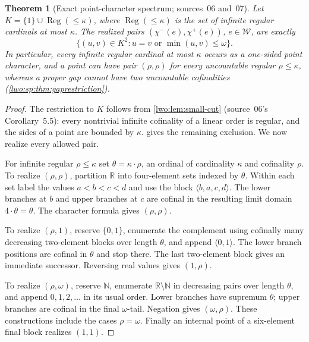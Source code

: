\documentclass[11pt,a4paper]{article}
\newtheorem{theorem}{Theorem}[section]
\theoremstyle{definition}
\theoremstyle{remark}
\newcommand{\R}{\mathbb R}
\newcommand{\N}{\mathbb N}
\newcommand{\W}{\mathcal W}
\newcommand{\Reg}{\operatorname{Reg}}
\newcommand{\chm}{\chi^-}
\newcommand{\chp}{\chi^+}
\begin{document}
\begin{theorem}[Exact point-character spectrum; sources~06 and~07]
\label{lwo:sp:thm:point-spectrum}
Let $K=\{1\}\cup\Reg(\le\kappa)$, where $\Reg(\le\kappa)$ is the set of infinite
regular cardinals at most $\kappa$. The realized pairs $(\chm(e),\chp(e))$,
$e\in\W$, are exactly
\begin{equation}\label{lwo:sp:eq:pointpairs}
 \{(u,v)\in K^2:u=v\text{ or }\min(u,v)\leq\omega\}.
\end{equation}
In particular, every infinite regular cardinal at most $\kappa$ occurs as a
one-sided point character, and a point can have pair $(\rho,\rho)$ for every
uncountable regular $\rho\leq\kappa$, whereas a proper gap cannot have two
uncountable cofinalities (\cref{lwo:sp:thm:gaprestriction}).
\end{theorem}
\begin{proof}
The restriction to $K$ follows from \cref{lwo:lem:small-cut} (source~06's
Corollary~5.5): every nontrivial infinite cofinality of a linear order is
regular, and the sides of a point are bounded by $\kappa$.
 gives the remaining exclusion. We now realize
every allowed pair.

For infinite regular $\rho\leq\kappa$ set $\theta=\kappa\cdot\rho$, an ordinal
of cardinality $\kappa$ and cofinality $\rho$. To realize $(\rho,\rho)$,
partition $\R$ into four-element sets indexed by $\theta$. Within each set
label the values $a<b<c<d$ and use the block $\langle b,a,c,d\rangle$. The
lower branches at $b$ and upper branches at $c$ are cofinal in the resulting
limit domain $4\cdot\theta=\theta$. The character formula gives $(\rho,\rho)$.

To realize $(\rho,1)$, reserve $\{0,1\}$, enumerate the complement using
cofinally many decreasing two-element blocks over length $\theta$, and append
$\langle0,1\rangle$. The lower branch positions are cofinal in $\theta$ and
stop there. The last two-element block gives an immediate successor.
Reversing real values gives $(1,\rho)$.

To realize $(\rho,\omega)$, reserve $\N$, enumerate $\R\setminus\N$ in
decreasing pairs over length $\theta$, and append $0,1,2,\ldots$ in its usual
order. Lower branches have supremum $\theta$; upper branches are cofinal in
the final $\omega$-tail. Negation gives $(\omega,\rho)$. These constructions
include the cases $\rho=\omega$. Finally an internal point of a six-element
final block realizes $(1,1)$.
\end{proof}
\end{document}
